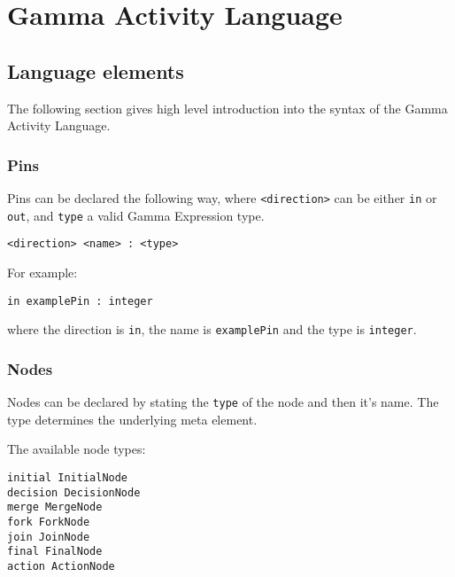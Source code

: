 \clearpage\section{Gamma Activity Language}\label{sec:gamma-activity-language-constructs}

\subsection*{Language elements}

The following section gives high level introduction into the syntax of the Gamma Activity Language.

\subsubsection*{Pins}\label{sssec:pins}

Pins can be declared the following way, where \verb|<direction>| can be either \verb|in| or \verb|out|, and \verb|type| a valid Gamma Expression type.

\begin{lstlisting}[language=activity]
<direction> <name> : <type>
\end{lstlisting}

For example: 

\begin{lstlisting}[language=activity]
in examplePin : integer
\end{lstlisting}

where the direction is \verb|in|, the name is \verb|examplePin| and the type is \verb|integer|.

\subsubsection*{Nodes}\label{sssec:nodes}

Nodes can be declared by stating the \verb|type| of the node and then it's name. The type determines the underlying meta element.

The available node types:

\begin{lstlisting}[language=activity]
initial InitialNode
decision DecisionNode
merge MergeNode
fork ForkNode
join JoinNode
final FinalNode
action ActionNode
\end{lstlisting}

